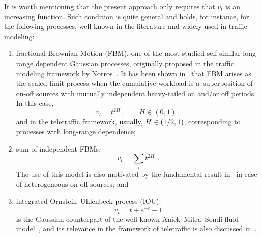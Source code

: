 \begin{multicols}{2}
It is worth mentioning that the present approach only requires that $v_t$ is an 
increasing function. Such condition is quite general and holds, for instance, 
for the following processes, well-known in the literature and widely-used in 
traffic modeling:
\begin{enumerate}[(1)]
\item fractional Brownian Motion (FBM), one of the most studied 
self-similar long-range dependent Gaussian processes,  originally proposed 
in the traffic modeling framework by Norros~\cite{norrosJSAC}. It has been shown 
in~\cite{Taqqu} that FBM arises as
the scaled limit process when the cumulative workload is 
a~superposition of on-off sources with mutually independent
heavy-tailed on and/or off periods. In this case,
$$
v_t=t^{2H}\,, \qquad H \in (0,1)\,,
$$
and in the teletraffic framework, usually, $H\linebreak \in (1/2,1)$, corresponding 
to processes with long-range dependence;

\item sum of independent FBMs:
$$
v_t=\sum_i t^{2 H_i}\,.
$$
The use of this model is also motivated by the fundamental result in~\cite{Taqqu} 
in case of heterogeneous on-off sources; and

\item integrated Ornstein--Uhlenbeck process (IOU):
$$
v_t=t+e^{-t}-1
$$
is the Gaussian counterpart of the well-known Anick--Mitra--Sondi 
fluid model~\cite{Addie}, and its relevance in the framework of teletraffic
 is also discussed in~\cite{Kulkarni}.
\end{enumerate}



\end{multicols}
